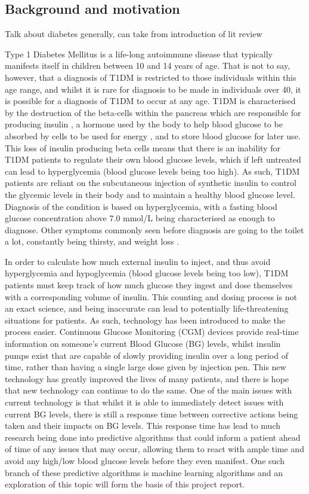   \subsection{Background and motivation}
    Talk about diabetes generally, can take from introduction of lit review

    Type 1 Diabetes Mellitus is a life-long autoimmune disease that typically manifests itself in children between 10 and 14 years of age. That is not to say, however, that a diagnosis of T1DM is restricted to those individuals within this age range, and whilst it is rare for diagnosis to be made in individuals over 40, it is possible for a diagnosis of T1DM to occur at any age. T1DM is characterised by the destruction of the beta-cells within the pancreas which are responsible for producing insulin \cite{t1d}, a hormone used  by the body to help blood glucose to be absorbed by cells to be used for energy \cite{insulin}, and to store blood glucose for later use. This loss of insulin producing beta cells means that there is an inability for T1DM patients to regulate their own blood glucose levels, which if left untreated can lead to hyperglycemia (blood glucose levels being too high). As such, T1DM patients are reliant on the subcutaneous injection of synthetic insulin to control the glycemic levels in their body and to maintain a healthy blood glucose level. Diagnosis of the condition is based on hyperglycemia, with a fasting blood glucose concentration above 7.0 mmol/L being characterised as enough to diagnose. Other symptoms commonly seen before diagnosis are going to the toilet a lot, constantly being thirsty, and weight loss \cite{t1dcauses}.

    In order to calculate how much external insulin to inject, and thus avoid hyperglycemia and hypoglycemia (blood glucose levels being too low), T1DM patients must keep track of how much glucose they ingest and dose themselves with a corresponding volume of insulin. This counting and dosing process is not an exact science, and being inaccurate can lead to potentially life-threatening situations for patients. As such, technology has been introduced to make the process easier. Continuous Glucose Monitoring (CGM) devices \cite{pumpcgm} provide real-time information on someone's current Blood Glucose (BG) levels, whilst insulin pumps exist that are capable of slowly providing insulin over a long period of time, rather than having a single large dose given by injection pen. This new technology has greatly improved the lives of many patients, and there is hope that new technology can continue to do the same. One of the main issues with current technology is that whilst it is able to immediately detect issues with current BG levels, there is still a response time between corrective actions being taken and their impacts on BG levels. This response time has lead to much research being done into predictive algorithms that could inform a patient ahead of time of any issues that may occur, allowing them to react with ample time and avoid any high/low blood glucose levels before they even manifest. One such branch of these predictive algorithms is machine learning algorithms and an exploration of this topic will form the basis of this project report.
  
